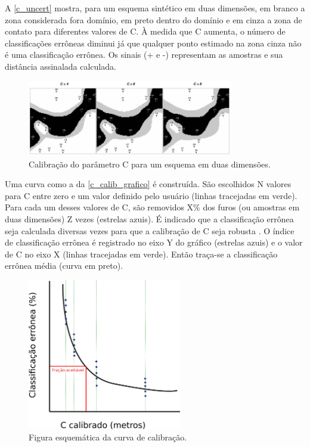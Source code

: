 A \autoref{c_uncert} mostra, para um esquema sintético em duas dimensões, em branco a zona considerada fora domínio, em preto dentro do domínio e em cinza a zona de contato para diferentes valores de C. À medida que C aumenta, o número de classificações errôneas diminui já que qualquer ponto estimado na zona cinza não é uma classificação errônea. Os sinais (+ e -) representam as amostras e sua distância assinalada calculada.

\begin{figure}[H]
	\caption{\label{c_uncert}Calibração do parâmetro C para um esquema em duas dimensões.}
	\centering
		\includegraphics[width=0.8\textwidth]{capitulo_2/imagens/c_uncert.png}
\end{figure}

Uma curva como a da \autoref{c_calib_grafico} é construída. São escolhidos N valores para C entre zero e um valor definido pelo usuário (linhas tracejadas em verde). Para cada um desses valores de C, são removidos X\% dos furos (ou amostras em duas dimensões) Z vezes (estrelas azuis). É indicado que a classificação errônea seja calculada diversas vezes para que a calibração de C seja robusta \cite{wilde2012kriging}. O índice de classificação errônea é registrado no eixo Y do gráfico (estrelas azuis) e o valor de C no eixo X (linhas tracejadas em verde). Então traça-se a classificação errônea média (curva em preto).

\begin{figure}[H]
	\caption{\label{c_calib_grafico}Figura esquemática da curva de calibração.}
	\centering
		\includegraphics[width=0.6\textwidth]{capitulo_2/imagens/calibration.png}
\end{figure}

